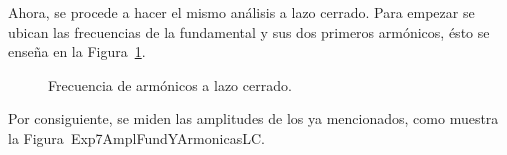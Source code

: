       Ahora, se procede a hacer el mismo análisis a lazo cerrado. Para empezar se ubican las frecuencias 
      de la fundamental y sus dos primeros armónicos, ésto se enseña en la Figura~\ref{fig:Exp7FrecLazoCerrado}.

      \begin{figure}[H]
        \centering
          \caption{Frecuencia de armónicos a lazo cerrado.}
          \label{fig:Exp7FrecLazoCerrado}
      \end{figure}

      Por consiguiente, se miden las amplitudes de los ya mencionados, como muestra la Figura~{Exp7AmplFundYArmonicasLC}.

